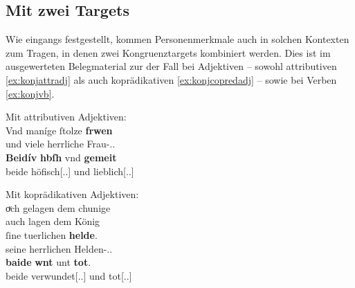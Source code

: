 \subsection{Mit zwei Targets}
\label{subsec:beidkoordtarg}

Wie eingangs festgestellt, kommen Personenmerkmale auch in solchen Kontexten
zum Tragen, in denen zwei Kongruenztargets kombiniert werden. Dies ist im
ausgewerteten Belegmaterial zur \KC{} der Fall bei Adjektiven --
sowohl attributiven \cref{ex:konjattradj} als auch koprädikativen
\cref{ex:konjcopredadj} -- sowie bei Verben \cref{ex:konjvb}.

\begin{exe}
\ex \begin{xlist}
	\ex \label{ex:konjattradj}
		Mit attributiven Adjektiven:\\
		\gll Vnd maníge ſtolze \textbf{frwen} \\
			und viele herrliche Frau-\Nom.\Pl.\FemF{} \\
	\sn \gll \textbf{Beidív} \textbf{hbſh} vnd \textbf{gemeit} \\
			beide höfisch[\Nom.\Pl.\FemF] und lieblich[\Nom.\Pl.\FemF] \\
		\begin{taggedline}{\parencites[\pno~21\va, 21--22]{kc:VB}[zu][4351--4352]{schroeder1895}}
			\trans {}
		\end{taggedline}


	\ex \label{ex:konjcopredadj}
		Mit koprädikativen Adjektiven:\\
		\gll oͮch gelagen dem chunige \\
			auch lagen dem König \\
	\sn \gll ſine tuerlichen \textbf{helde}. \\
			seine herrlichen Helden-\Nom.\Pl.\MascM{} \\
	\sn \gll \textbf{baide} \textbf{wnt} unt \textbf{tot}. \\
			beide verwundet[\Nom.\Pl.\MascM] und tot[\Nom.\Pl.\MascM] \\
		\begin{taggedline}{\parencites[\pno~67\vb, 34--36]{kc:A1}[vgl.][15880--15883]{schroeder1895}}
			\trans {}
		\end{taggedline}


\end{xlist}
\end{exe}
